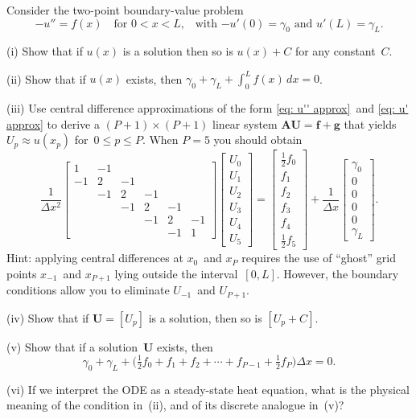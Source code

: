 \begin{Exercises}
\exercise
Consider the two-point boundary-value problem
\[
-u''=f(x)\quad\text{for $0<x<L$,}
	\quad\text{with $-u'(0)=\gamma_0$ and $u'(L)=\gamma_L$.}
\]
\begin{description}
\item{(i)} Show that if $u(x)$ is a solution then so is $u(x)+C$ for any 
constant~$C$.
\item{(ii)} Show that if $u(x)$ exists, then 
$\gamma_0+\gamma_L+\int_0^Lf(x)\,dx=0$.
\item{(iii)} Use central difference approximations of the form 
\eqref{eq: u'' approx}~and \eqref{eq: u' approx} to derive a $(P+1)\times(P+1)$ 
linear system 
$\boldsymbol{A}\boldsymbol{U}=\boldsymbol{f}+\boldsymbol{g}$ that yields
$U_p\approx u(x_p)$ for~$0\le p\le P$.  When $P=5$ you should obtain
\[
\frac{1}{\Delta x^2}\begin{bmatrix}
 1&-1&  &  &  &\\                     
-1& 2&-1&  &  &\\
  &-1& 2&-1&  &\\
  &  &-1& 2&-1&\\
  &  &  &-1& 2&-1\\
  &  &  &  &-1& 1
\end{bmatrix}
\begin{bmatrix}U_0\\ U_1\\ U_2\\ U_3\\ U_4\\ U_5\end{bmatrix}
=\begin{bmatrix}\tfrac12f_0\\ f_1\\ f_2\\ f_3\\ f_4\\ \tfrac12 f_5
\end{bmatrix}
+\frac{1}{\Delta x}
\begin{bmatrix}\gamma_0\\ 0\\ 0\\ 0\\ 0\\ \gamma_L\end{bmatrix}.
\]
Hint: applying central differences at $x_0$~and $x_P$ requires the use of 
``ghost'' grid points $x_{-1}$~and $x_{P+1}$ lying outside the interval~$[0,L]$.
However, the boundary conditions allow you to eliminate $U_{-1}$~and $U_{P+1}$.
\item{(iv)} Show that if $\boldsymbol{U}=[U_p]$ is a solution, then so is 
$[U_p+C]$.
\item{(v)} Show that if a solution~$\boldsymbol{U}$ exists, then
\[
\gamma_0+\gamma_L+\bigl(\tfrac12f_0+f_1+f_2+\cdots+f_{P-1}+\tfrac12f_P\bigr)
\Delta x=0.
\]
\item{(vi)} If we interpret the ODE as a steady-state heat equation, what is 
the physical meaning of the condition in~(ii), and of its discrete analogue 
in~(v)?
\end{description}


\end{Exercises}
